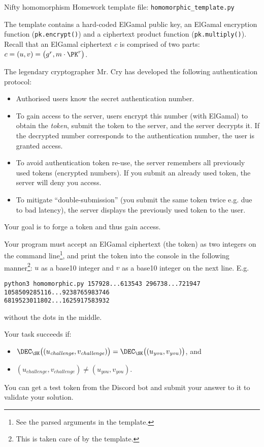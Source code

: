 \documentclass{homework}
\begin{document}
\begin{task}{Nifty homomorphism}
  Homework template file: \texttt{homomorphic\_template.py}

  The template contains a hard-coded ElGamal public key, an ElGamal encryption function (\texttt{pk.encrypt()}) and a ciphertext product function (\texttt{pk.multiply()}).
  Recall that an ElGamal ciphertext $c$ is comprised of two parts: $c = (u, v) = \bigl(g^r, m\cdot\PK^r\bigr)$.

  The legendary cryptographer Mr. Cry has developed the following authentication protocol:
  \begin{itemize}
    \item Authorised users know the secret authentication number.
    \item To gain access to the server, users encrypt this number (with ElGamal) to obtain the \emph{token}, submit the token to the server, and the server decrypts it.
    If the decrypted number corresponds to the authentication number, the user is granted access.
    \item To avoid authentication token re-use, the server remembers all previously used tokens (encrypted numbers).
    If you submit an already used token, the server will deny you access.
    \item To mitigate \enquote{double-submission} (you submit the same token twice e.g. due to bad latency), the server displays the previously used token to the user.
  \end{itemize}

  Your goal is to forge a token and thus gain access.

  Your program must accept an ElGamal ciphertext (the token) as two integers on the command line\footnote{See the parsed arguments in the template.}, and print the token into the console in the following manner\footnote{This is taken care of by the template.}: $u$ as a base10 integer and $v$ as a base10 integer on the next line.
  E.g.
  \begin{Verbatim}
python3 homomorphic.py 157928...613543 296738...721947
1058509285116...9238765983746
6819523011802...1625917583932
  \end{Verbatim}
  without the dots in the middle.
  
  Your task succeeds if:
  \begin{itemize}
    \item $\DEC_\SK\bigl((u_\mathit{challenge}, v_\mathit{challenge})\bigr) = \DEC_\SK\bigl((u_\mathit{you}, v_\mathit{you})\bigr)$, and
    \item $(u_\mathit{challenge}, v_\mathit{challenge}) \neq (u_\mathit{you}, v_\mathit{you})$.
  \end{itemize}

  You can get a test token from the Discord bot and submit your answer to it to validate your solution.
\end{task}
\end{document}
